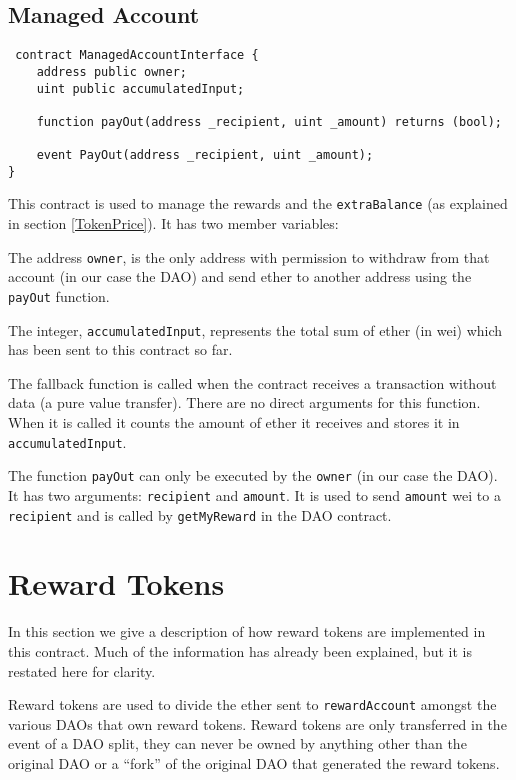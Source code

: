 \documentclass[9pt,oneside]{amsart}
\begin{document}
\subsection{Managed Account}
\begin{verbatim}
 contract ManagedAccountInterface {
    address public owner;
    uint public accumulatedInput;

    function payOut(address _recipient, uint _amount) returns (bool);

    event PayOut(address _recipient, uint _amount);
}
\end{verbatim}
\begin{multicols}{2}
This contract is used to manage the rewards and the \verb|extraBalance| (as explained in section \ref{TokenPrice}). It has two member variables:

The address \verb|owner|, is the only address with permission to withdraw from that account (in our case the DAO) and send ether to another address using the \verb|payOut| function.

The integer, \verb|accumulatedInput|, represents the total sum of ether (in wei) which has been sent to this contract so far.

The fallback function is called when the contract receives a transaction without data (a pure value transfer). There are no direct arguments for this function. When it is called it counts the amount of ether it receives and stores it in \verb|accumulatedInput|.

The function \verb|payOut| can only be executed by the \verb|owner| (in our case the DAO). It has two arguments: \verb|recipient| and \verb|amount|. It is used to send \verb|amount| wei to a \verb|recipient| and is called by \verb|getMyReward| in the DAO contract.

\section{Reward Tokens} \label{RewardToken}

In this section we give a description of how reward tokens are implemented in this contract. Much of the information has already been explained, but it is restated here for clarity. 

Reward tokens are used to divide the ether sent to \verb|rewardAccount| amongst the various DAOs that own reward tokens. Reward tokens are only transferred in the event of a DAO split, they can never be owned by anything other than the original DAO or a “fork” of the original DAO that generated the reward tokens.  


\end{multicols}
\end{document}
